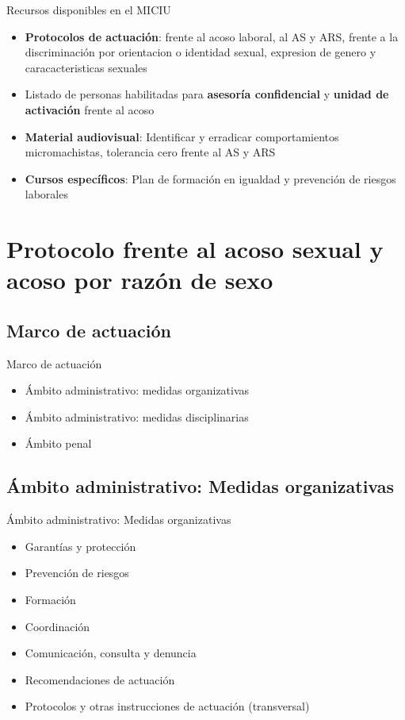 \documentclass{beamer}
\begin{document}
    \begin{frame}{Recursos disponibles en el MICIU}
        \begin{itemize}
            \item \textbf{Protocolos de actuación}: frente al acoso laboral, al AS y ARS, frente a la discriminación por orientacion o identidad sexual, expresion de genero y caracacteristicas sexuales
            \item Listado de personas habilitadas para \textbf{asesoría confidencial} y \textbf{unidad de activación} frente al acoso
            \item \textbf{Material audiovisual}: Identificar y erradicar comportamientos micromachistas, tolerancia cero frente al AS y ARS
            \item \textbf{Cursos específicos}: Plan de formación en igualdad y prevención de riesgos laborales
        \end{itemize}
    \end{frame}


    \section{Protocolo frente al acoso sexual y acoso por razón de sexo}

    \subsection{Marco de actuación}
    \begin{frame}{Marco de actuación}
        \begin{itemize}
            \item Ámbito administrativo: medidas organizativas
            \item Ámbito administrativo: medidas disciplinarias
            \item Ámbito penal
        \end{itemize}
    \end{frame}

    \subsection{Ámbito administrativo: Medidas organizativas}
    \begin{frame}{Ámbito administrativo: Medidas organizativas}
        \begin{itemize}
            \item Garantías y protección
            \item Prevención de riesgos
            \item Formación
            \item Coordinación
            \item Comunicación, consulta y denuncia
            \item Recomendaciones de actuación
            \item Protocolos y otras instrucciones de actuación (transversal)
        \end{itemize}
    \end{frame}
\end{document}
